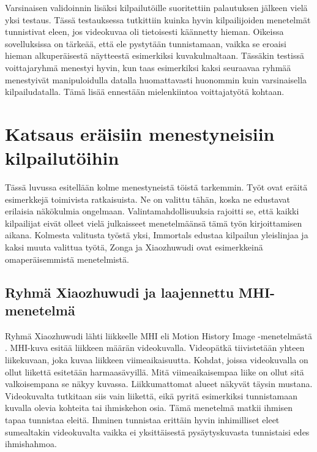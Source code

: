 Varsinaisen validoinnin lisäksi kilpailutöille suoritettiin palautuksen jälkeen vielä yksi testaus. Tässä testauksessa tutkittiin kuinka 
hyvin kilpailijoiden menetelmät tunnistivat eleen, jos videokuvaa oli tietoisesti käännetty hieman. Oikeissa sovelluksissa on tärkeää,
että ele pystytään tunnistamaan, vaikka se eroaisi hieman alkuperäisestä näytteestä esimerkiksi kuvakulmaltaan. 
Tässäkin testissä voittajaryhmä menestyi hyvin, kun taas esimerkiksi kaksi seuraavaa ryhmää menestyivät manipuloidulla datalla huomattavasti
huonommin kuin varsinaisella kilpailudatalla. Tämä lisää ennestään mielenkiintoa voittajatyötä kohtaan. \citep{chalearn2}


\section {Katsaus eräisiin menestyneisiin kilpailutöihin}

Tässä luvussa esitellään kolme menestyneistä töistä tarkemmin. Työt ovat eräitä esimerkkejä toimivista ratkaisuista. Ne on valittu tähän, 
koska ne edustavat erilaisia näkökulmia ongelmaan. Valintamahdollisuuksia rajoitti se, että kaikki kilpailijat eivät olleet vielä julkaisseet 
menetelmäänsä tämä työn kirjoittamisen aikana. Kolmesta valitusta työstä yksi, Immortals edustaa kilpailun yleislinjaa ja kaksi muuta valittua työtä,
Zonga ja Xiaozhuwudi ovat esimerkkeinä omaperäisemmistä menetelmistä.\\

\subsection{Ryhmä Xiaozhuwudi ja laajennettu MHI-menetelmä}
Ryhmä Xiaozhuwudi lähti liikkeelle MHI eli Motion History Image -menetelmästä \citep {6239179}. MHI-kuva esitää liikkeen määrän videokuvalla.
Videopätkä tiivistetään yhteen liikekuvaan, joka kuvaa liikkeen viimeaikaisuutta. Kohdat, joissa videokuvalla on ollut
liikettä esitetään harmaasävyillä. Mitä viimeaikaisempaa liike on ollut sitä valkoisempana se näkyy kuvassa. Liikkumattomat
alueet näkyvät täysin mustana. Videokuvalta tutkitaan siis vain liikettä, eikä pyritä esimerkiksi tunnistamaan kuvalla olevia kohteita
tai ihmiskehon osia. Tämä menetelmä matkii ihmisen tapaa tunnistaa eleitä. Ihminen tunnistaa erittäin hyvin inhimilliset eleet  
sumealtakin videokuvalta vaikka ei yksittäisestä pysäytyskuvasta tunnistaisi edes ihmishahmoa. \citep {910878}  \\

